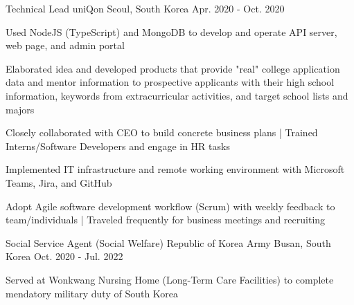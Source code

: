 

\begin{cventries}

  \cventry
  {Technical Lead} %
  {uniQon} %
  {Seoul, South Korea} %
  {Apr. 2020 - Oct. 2020} %
  {
    \begin{cvitems} %
      \item {Used NodeJS (TypeScript) and MongoDB to develop and operate API server, web page, and admin portal}
      \item {Elaborated idea and developed products that provide "real" college application data and mentor information to prospective applicants with their high school information, keywords from extracurricular activities, and target school lists and majors}
      \item {Closely collaborated with CEO to build concrete business plans | Trained Interns/Software Developers and engage in HR tasks}
      \item {Implemented IT infrastructure and remote working environment with Microsoft Teams, Jira, and GitHub}
      \item {Adopt Agile software development workflow (Scrum) with weekly feedback to team/individuals | Traveled frequently for business meetings and recruiting}
    \end{cvitems}
  }

  \cventry
  {Social Service Agent (Social Welfare)} %
  {Republic of Korea Army} %
  {Busan, South Korea} %
  {Oct. 2020 - Jul. 2022} %
  {
    \begin{cvitems} %
      \item {Served at Wonkwang Nursing Home (Long-Term Care Facilities) to complete mendatory military duty of South Korea}
    \end{cvitems}
  }


\end{cventries}
